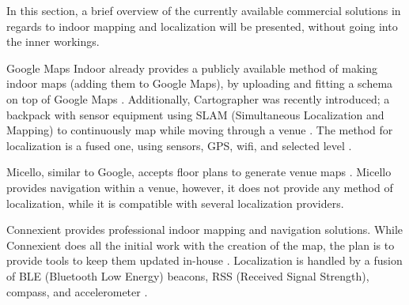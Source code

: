 In this section, a brief overview of the currently available commercial solutions in regards to indoor mapping and localization will be presented, without going into the inner workings.

Google Maps Indoor already provides a publicly available method of making indoor maps (adding them to Google Maps), by uploading and fitting a schema on top of Google Maps \cite{google_maps_indoor}.
Additionally, Cartographer was recently introduced; a backpack with sensor equipment using SLAM (Simultaneous Localization and Mapping) to continuously map while moving through a venue \cite{cartographer}.
The method for localization is a fused one, using sensors, GPS, wifi, and selected level \cite[Slide 45]{indoor_maps_google_slides}.

Micello, similar to Google, accepts floor plans to generate venue maps \cite{micello}.
Micello provides navigation within a venue, however, it does not provide any method of localization, while it is compatible with several localization providers.

Connexient provides professional indoor mapping and navigation solutions.
While Connexient does all the initial work with the creation of the map, the plan is to provide tools to keep them updated in-house \cite{connexient_indoor_map}.
Localization is handled by a fusion of BLE (Bluetooth Low Energy) beacons, RSS (Received Signal Strength), compass, and accelerometer \cite{connexient_indoor_pos}.

